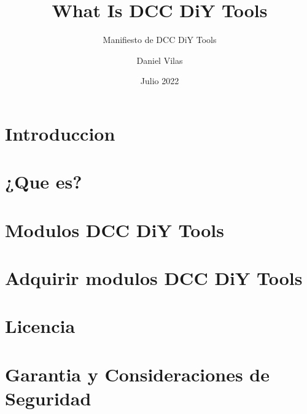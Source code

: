 \documentclass[spanish]{DccDiyTools/DccDiyTools}
\title{What Is DCC DiY Tools}
\subtitle{Manifiesto de DCC DiY Tools}
\author{Daniel Vilas}
\date{Julio 2022}
\begin{document}
\maketitle
\newpage
\section{Introduccion}


\newpage
\section{¿Que es?}


\newpage
\section{Modulos DCC DiY Tools}


\newpage
\section{Adquirir modulos DCC DiY Tools}


\newpage
\section{Licencia}


\newpage
\section{Garantia y Consideraciones de Seguridad}

\end{document}
